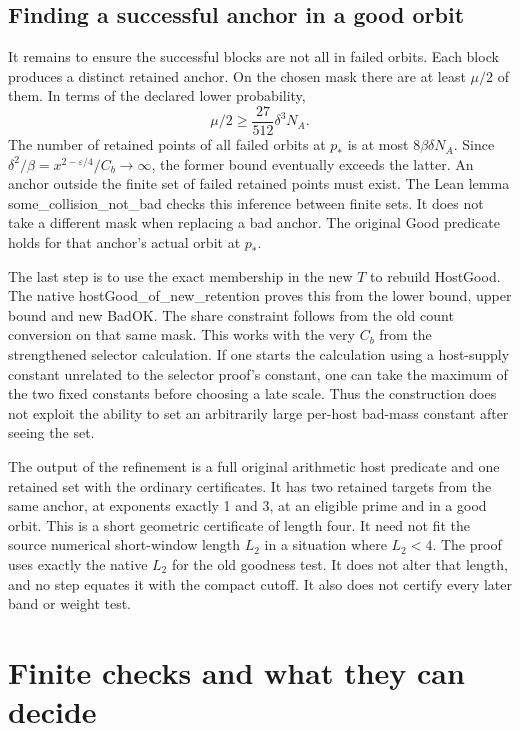 \documentclass[12pt,letterpaper]{article}
\DeclareRobustCommand{\id}[1]{\mbox{\small\ttfamily #1}}
\begin{document}
\subsection{Finding a successful anchor in a good orbit}

It remains to ensure the successful blocks are not all in failed orbits. Each block produces a distinct retained anchor. On the chosen mask there are at least \(\mu/2\) of them. In terms of the declared lower probability,
\[
              \mu/2\ge\frac{27}{512}\delta^3 N_A.
\]
The number of retained points of all failed orbits at \(p_\ast\) is at most \(8\beta\delta N_A\). Since \(\delta^2/\beta=x^{2-\varepsilon/4}/C_b\to\infty\), the former bound eventually exceeds the latter. An anchor outside the finite set of failed retained points must exist. The Lean lemma \id{some\_collision\_not\_bad} checks this inference between finite sets. It does not take a different mask when replacing a bad anchor. The original \id{Good} predicate holds for that anchor's actual orbit at \(p_\ast\).

The last step is to use the exact membership in the new \(T\) to rebuild \id{HostGood}. The native \id{hostGood\_of\_new\_retention} proves this from the lower bound, upper bound and new \id{BadOK}. The share constraint follows from the old count conversion on that same mask. This works with the very \(C_b\) from the strengthened selector calculation. If one starts the calculation using a host-supply constant unrelated to the selector proof's constant, one can take the maximum of the two fixed constants before choosing a late scale. Thus the construction does not exploit the ability to set an arbitrarily large per-host bad-mass constant after seeing the set.

The output of the refinement is a full original arithmetic host predicate and one retained set with the ordinary certificates. It has two retained targets from the same anchor, at exponents exactly 1 and 3, at an eligible prime and in a good orbit. This is a short geometric certificate of length four. It need not fit the source numerical short-window length \(L_2\) in a situation where \(L_2<4\). The proof uses exactly the native \(L_2\) for the old goodness test. It does not alter that length, and no step equates it with the compact cutoff. It also does not certify every later band or weight test.

\section{Finite checks and what they can decide}
\label{sec:controls}
\end{document}
